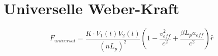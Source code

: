 \section{Universelle Weber-Kraft}
\[ F_{universal} = \frac{K \cdot V_1(t) V_2(t)}{(nL_p)^2} \left(1 - \frac{v_{eff}^2}{c^2} + \frac{\beta L_p a_{eff}}{c^2}\right)\hat{r} \]